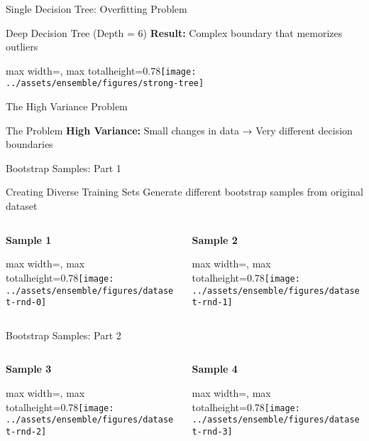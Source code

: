 \documentclass[10pt]{beamer}
\newcommand{\fitpic}[1]{\begin{adjustbox}{max width=\linewidth, max totalheight=0.78\textheight}#1\end{adjustbox}}
\begin{document}
\begin{frame}{Single Decision Tree: Overfitting Problem}
\begin{examplebox}{Deep Decision Tree (Depth = 6)}
\textbf{Result:} Complex boundary that memorizes outliers
\end{examplebox}

  \begin{center}
  \fitpic{\texttt{[image: ../assets/ensemble/figures/strong-tree]}}
  \end{center}
\end{frame}

\begin{frame}{The High Variance Problem}
\begin{alertbox}{The Problem}
\textbf{High Variance:} Small changes in data → Very different decision boundaries
\end{alertbox}
\end{frame}

\begin{frame}{Bootstrap Samples: Part 1}
\begin{examplebox}{Creating Diverse Training Sets}
Generate different bootstrap samples from original dataset
\end{examplebox}

\begin{center}
\begin{columns}
\begin{column}{0.45\textwidth}
\centering
\textbf{Sample 1}

\fitpic{\texttt{[image: ../assets/ensemble/figures/dataset-rnd-0]}}
\end{column}

\begin{column}{0.45\textwidth}
\centering
\textbf{Sample 2}

\fitpic{\texttt{[image: ../assets/ensemble/figures/dataset-rnd-1]}}
\end{column}
\end{columns}
\end{center}
\end{frame}

\begin{frame}{Bootstrap Samples: Part 2}
\begin{center}
\begin{columns}
\begin{column}{0.45\textwidth}
\centering
\textbf{Sample 3}

\fitpic{\texttt{[image: ../assets/ensemble/figures/dataset-rnd-2]}}
\end{column}

\begin{column}{0.45\textwidth}
\centering
\textbf{Sample 4}

\fitpic{\texttt{[image: ../assets/ensemble/figures/dataset-rnd-3]}}
\end{column}
\end{columns}
\end{center}
\end{frame}
\end{document}
